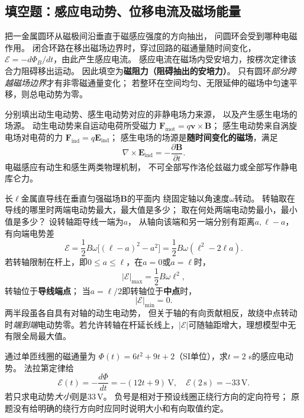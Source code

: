 
\subsection{填空题：感应电动势、位移电流及磁场能量}

\problemtext 把一金属圆环从磁极间沿垂直于磁感应强度的方向抽出，
问圆环会受到哪种电磁作用。
\workings
闭合环路在移出磁场边界时，穿过回路的磁通量随时间变化，
$\mathcal E=-d\Phi_B/dt$，由此产生感应电流。
感应电流在磁场内受安培力，按楞次定律该合力阻碍移出运动。
因此填空为\textbf{磁阻力（阻碍抽出的安培力）}。
\crosscheck 只有圆环\emph{部分跨越磁场边界}才有非零磁通量变化；
若整环在空间均匀、无限延伸的磁场中匀速平移，则总电动势为零。

\problemtext 分别填出动生电动势、感生电动势对应的非静电场力来源，
以及产生感生电场的场源。
\workings
动生电动势来自运动电荷所受磁力
$\boxed{\bm F_{\mathrm{mot}}=q\bm v\times\bm B}$；
感生电动势来自涡旋电场对电荷的力
$\boxed{\bm F_{\mathrm{ind}}=q\bm E_{\mathrm{ind}}}$；
感生电场的场源是\textbf{随时间变化的磁场}，满足
\[
\boxed{\nabla\times\bm E_{\mathrm{ind}}
=-\frac{\partial\bm B}{\partial t}}.
\]
\crosscheck 电磁感应有动生和感生两类物理机制，
不可全部写作洛伦兹磁力或全部写作静电库仑力。

\problemtext 长$\ell$金属直导线在垂直匀强磁场$\bm B$的平面内
绕固定轴以角速度$\omega$转动。
转轴取在导线的哪里时两端电动势最大，最大值是多少；
取在何处两端电动势最小，最小值是多少？
\workings
设转轴距导线一端为$a$，
从轴向该端和另一端分别有距离$a,\ell-a$，
有向端电势差
\[
\mathcal E=\frac12B\omega
\bigl[(\ell-a)^2-a^2\bigr]
=\frac12B\omega(\ell^2-2\ell a).
\]
若转轴限制在杆上，即$0\le a\le\ell$，在$a=0$或$a=\ell$时，
\[
\boxed{|\mathcal E|_{\max}=\frac12B\omega\ell^2},
\]
转轴位于\textbf{导线端点}；
当$a=\ell/2$即转轴位于\textbf{中点}时，
\[
\boxed{|\mathcal E|_{\min}=0}.
\]
\crosscheck 两半段虽各自具有对轴的动生电动势，
但关于轴的有向贡献相反，故绕中点转动时\emph{端到端}电动势零。若允许转轴在杆延长线上，$|\mathcal E|$可随轴距增大，理想模型中无有限全局最大值。

\problemtext 通过单匝线圈的磁通量为
$\Phi(t)=6t^2+9t+2$（SI单位），求$t=2$ s的感应电动势。
\workings
法拉第定律给
\[
\mathcal E(t)=-\frac{d\Phi}{dt}=-(12t+9)\,\mathrm V,
\quad\boxed{\mathcal E(2\,\mathrm s)=-33\,\mathrm V}.
\]
若只求电动势\emph{大小}则是$\boxed{33\,\mathrm V}$。
\crosscheck 负号是相对于预设线圈正绕行方向的定向符号；
原题没有给明确的绕行方向时应同时说明大小和有向取值约定。

